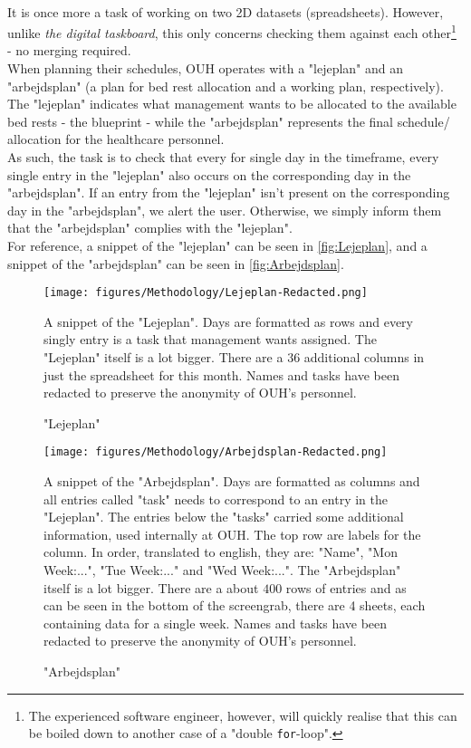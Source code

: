 \\
It is once more a task of working on two 2D datasets (spreadsheets). However, unlike \emph{the digital taskboard}, this only concerns checking them against each other\footnote{The experienced software engineer, however, will quickly realise that this can be boiled down to another case of a "double \texttt{for}-loop".} - no merging required.
\\
When planning their schedules, OUH operates with a "lejeplan" and an "arbejdsplan" (a plan for bed rest allocation and a working plan, respectively). The "lejeplan" indicates what management wants to be allocated to the available bed rests - the blueprint - while the "arbejdsplan" represents the final schedule/ allocation for the healthcare personnel. 
\\
As such, the task is to check that every for single day in the timeframe, every single entry in the "lejeplan" also occurs on the corresponding day in the "arbejdsplan". If an entry from the "lejeplan" isn't present on the corresponding day in the "arbejdsplan", we alert the user. Otherwise, we simply inform them that the "arbejdsplan" complies with the "lejeplan".
\\
For reference, a snippet of the "lejeplan" can be seen in \autoref{fig:Lejeplan}, and a snippet of the "arbejdsplan" can be seen in \autoref{fig:Arbejdsplan}.
\begin{figure}[H]
    \centering
    \texttt{[image: figures/Methodology/Lejeplan-Redacted.png]}
    \caption{"Lejeplan"}
    \small
    \raggedright 
    A snippet of the "Lejeplan". Days are formatted as rows and every singly entry is a task that management wants assigned. The "Lejeplan" itself is a lot bigger. There are a \(36\) additional columns in just the spreadsheet for this month. Names and tasks have been redacted to preserve the anonymity of OUH's personnel.
    \label{fig:Lejeplan}
\end{figure}

\begin{figure}[H]
    \centering
    \texttt{[image: figures/Methodology/Arbejdsplan-Redacted.png]}
    \caption{"Arbejdsplan"}
    \small
    \raggedright 
    A snippet of the "Arbejdsplan". Days are formatted as columns and all entries called "task" needs to correspond to an entry in the "Lejeplan". The entries below the "tasks" carried some additional information, used internally at OUH. The top row are labels for the column. In order, translated to english, they are: "Name", "Mon Week:...", "Tue Week:..." and "Wed Week:...". The "Arbejdsplan" itself is a lot bigger. There are a about \(400\) rows of entries and as can be seen in the bottom of the screengrab, there are 4 sheets, each containing data for a single week. Names and tasks have been redacted to preserve the anonymity of OUH's personnel.
    \label{fig:Arbejdsplan}
\end{figure}
